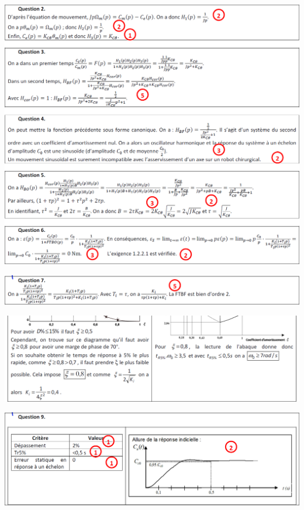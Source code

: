 \documentclass[10pt,fleqn]{article} %
\begin{document}
\begin{center}
\includegraphics[width=\linewidth]{images/cor_01}
\end{center}

\begin{center}
\includegraphics[width=\linewidth]{images/cor_02_01}
\end{center}


\begin{center}
\includegraphics[width=\linewidth]{images/cor_02_02}
\end{center}

\begin{center}
\includegraphics[width=\linewidth]{images/cor_03}
\end{center}
\end{document}
